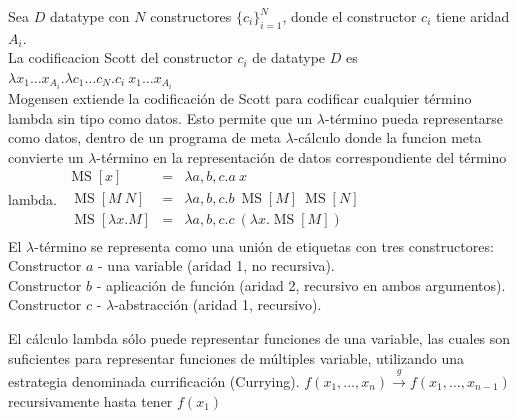 \begin{defn}\end{defn}
Sea $D$ datatype con $N$ constructores $\{c_i\}_{i=1}^N$, donde el constructor $c_i$ tiene aridad $A_i$. \\
La codificacion Scott del constructor $c_i$ de datatype $D$ es\\
$\lambda x_1 \dots x_{A_i} . \lambda c_1 \ldots c_N . c_i\ x_1 \dots x_{A_i}$\\
Mogensen extiende la codificación de Scott para codificar cualquier término lambda sin tipo como datos. Esto permite que un $\lambda$-término pueda representarse como datos, dentro de un programa de meta $\lambda$-cálculo donde la funcion meta convierte un $\lambda$-término en la representación de datos correspondiente del término lambda.
$\begin{array}{rcl}
\operatorname{MS}[x] & = & \lambda a, b, c.a\ x \\
\ \operatorname{MS}[M\ N] & = & \lambda a, b, c.b\ \operatorname{MS}[M]\ \operatorname{MS}[N] \\
\ \operatorname{MS}[\lambda x . M] & = & \lambda a, b, c.c\ (\lambda x.\operatorname{MS}[M]) \\
\end{array}$\vspace{0.2cm} \\
El $\lambda$-término se representa como una unión de etiquetas con tres constructores:\\
Constructor $a$ - una variable (aridad 1, no recursiva).\\
Constructor $b$ - aplicación de función (aridad 2, recursivo en ambos argumentos).\\
Constructor $c$ - $\lambda$-abstracción (aridad 1, recursivo).

\begin{note}
El cálculo lambda sólo puede representar funciones de una variable, 
las cuales son suficientes para representar funciones de múltiples variable, utilizando una estrategia denominada currificación (Currying).
$\displaystyle f(x_{1}, \dots, x_n) \xrightarrow{g} f(x_1, \dots, x_{n-1})$ recursivamente hasta tener $f(x_1)$
\end{note}


